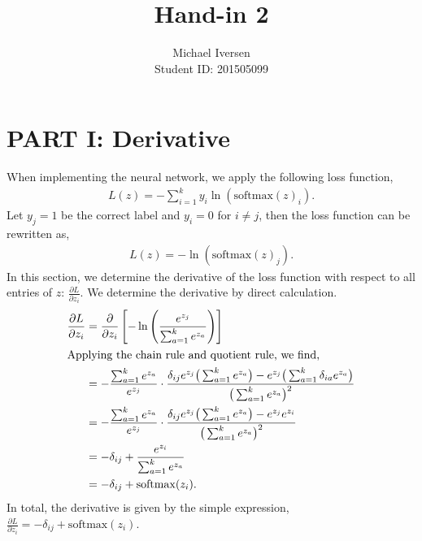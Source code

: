 \documentclass{article}
\title{Hand-in 2}
\author{Michael Iversen\\
Student ID: 201505099}
\begin{document}
\maketitle
\section*{PART I: Derivative}
When implementing the neural network, we apply the following loss function,
\begin{align*}
	L(z) = - \sum_{i=1}^k y_i \ln(\mathrm{softmax}(z)_i).
\end{align*}
Let $y_j = 1$ be the correct label and $y_i = 0$ for $i \neq j$, then the loss function can be rewritten as,
\begin{align*}
	L(z) = - \ln(\mathrm{softmax}(z)_j).
\end{align*}
In this section, we determine the derivative of the loss function with respect to all entries of $z$: $\frac{\partial L}{\partial z_i}$.
We determine the derivative by direct calculation.
\begin{align*}
	\frac{\partial L}{\partial z_i} &= \frac{\partial }{\partial z_i} \left[ - \ln \left( \frac{e^{z_j}}{\sum_{a=1}^k e^{z_a}} \right) \right] \\
	\intertext{Applying the chain rule and quotient rule, we find,}
	&= - \frac{\sum_{a=1}^k e^{z_a}}{e^{z_j}} \cdot \frac{\delta_{ij} e^{z_j} \big(\sum_{a=1}^k e^{z_a}\big) - e^{z_j} \big(\sum_{a=1}^k \delta_{ia}e^{z_a}\big)}{\big(\sum_{a=1}^k e^{z_a}\big)^2} \\
	&= - \frac{\sum_{a=1}^k e^{z_a}}{e^{z_j}} \cdot \frac{\delta_{ij} e^{z_j} \big(\sum_{a=1}^k e^{z_a}\big) - e^{z_j} e^{z_i}}{\big(\sum_{a=1}^k e^{z_a}\big)^2} \\
	&= - \delta_{ij} + \frac{e^{z_i}}{\sum_{a=1}^k e^{z_a}} \\
	&= - \delta_{ij} + \mathrm{softmax}(z_i).
\end{align*}
In total, the derivative is given by the simple expression, $\frac{\partial L}{\partial z_i}  = - \delta_{ij} + \mathrm{softmax}(z_i)$.
\end{document}

